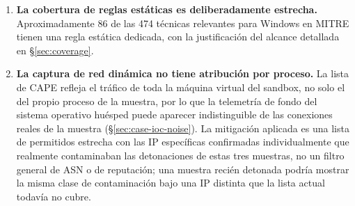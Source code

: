\begin{enumerate}
\item \label{lim:rule-coverage} \textbf{La cobertura de reglas
  est\'aticas es deliberadamente estrecha.} Aproximadamente 86 de las 474 t\'ecnicas relevantes para
  Windows en MITRE tienen una regla est\'atica dedicada, con la
  justificaci\'on del alcance detallada en \S\ref{sec:coverage}.

\item \label{lim:network-attribution} \textbf{La captura de red
  din\'amica no tiene atribuci\'on por proceso.} La lista  de CAPE refleja el
  tr\'afico de toda la m\'aquina virtual del sandbox, no solo el del
  propio proceso de la muestra, por lo que la telemetr\'ia de fondo del
  sistema operativo hu\'esped puede aparecer indistinguible de las
  conexiones reales de la muestra (\S\ref{sec:case-ioc-noise}). La
  mitigaci\'on aplicada es una lista de permitidos estrecha con las IP
  espec\'ificas confirmadas individualmente que realmente contaminaban
  las detonaciones de estas tres muestras, no un filtro general de ASN
  o de reputaci\'on; una muestra reci\'en detonada podr\'ia mostrar la
  misma clase de contaminaci\'on bajo una IP distinta que la lista
  actual todav\'ia no cubre.

\end{enumerate}
